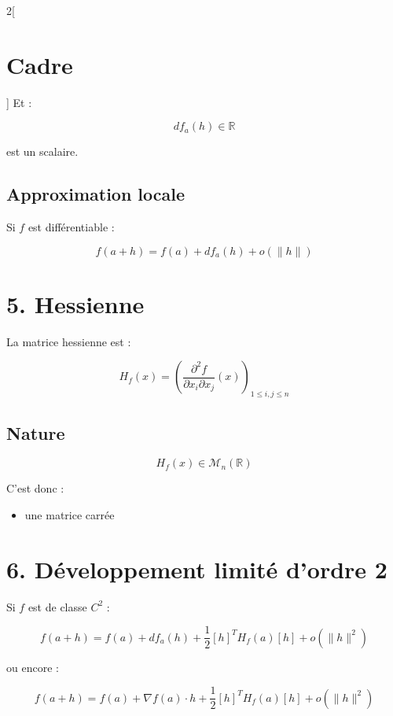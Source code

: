 \documentclass[a4paper,12pt]{article}
\begin{document}
\begin{multicols}{2}[
    \section*{Cadre}
    ]
        Et :

        $$
        df_a(h)\in\mathbb{R}
        $$

        est un scalaire.

        \subsection*{Approximation locale}

        Si $f$ est différentiable :

        $$
        f(a+h)
        =
        f(a)+df_a(h)+o(\|h\|)
        $$

    \section*{5. Hessienne}

        La matrice hessienne est :

        $$
        H_f(x)
        =
        \left(
        \frac{\partial^2 f}{\partial x_i\partial x_j}(x)
        \right)_{1\le i,j\le n}
        $$

        \subsection*{Nature}

        $$
        H_f(x)\in\mathcal{M}_n(\mathbb{R})
        $$

        C'est donc :
        \begin{itemize}
            \item une matrice carrée
        \end{itemize}

    \section*{6. Développement limité d'ordre 2}

        Si $f$ est de classe $C^2$ :

        $$
        f(a+h)
        =
        f(a)
        +
        df_a(h)
        +
        \frac12 [h]^T H_f(a) [h]
        +
        o(\|h\|^2)
        $$

        ou encore :

        $$
        f(a+h)
        =
        f(a)
        +
        \nabla f(a)\cdot h
        +
        \frac12 [h]^T H_f(a) [h]
        +
        o(\|h\|^2)
        $$

    \end{multicols}
\end{document}
